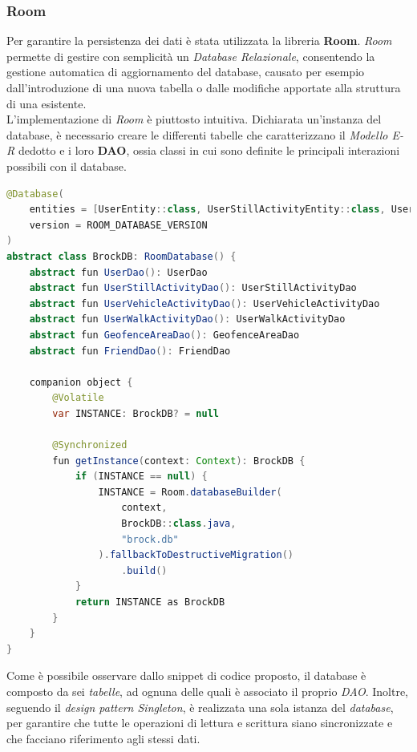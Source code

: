 \documentclass{article}
\begin{document}
    \subsubsection*{Room}
    Per garantire la persistenza dei dati è stata utilizzata la libreria \textbf{Room}. \textit{Room} permette di gestire con semplicità un \textit{Database Relazionale}, consentendo la gestione automatica di aggiornamento del database, causato per esempio dall'introduzione di una nuova tabella o dalle modifiche apportate alla struttura di una esistente. \vspace*{7pt}\\
    L'implementazione di \textit{Room} è piuttosto intuitiva. Dichiarata un'instanza del database, è necessario creare le differenti tabelle che caratterizzano il \textit{Modello E-R} dedotto e i loro \textbf{DAO}, ossia classi in cui sono definite le principali interazioni possibili con il database.
    \begin{lstlisting}[language = JAVA]
@Database(
    entities = [UserEntity::class, UserStillActivityEntity::class, UserVehicleActivityEntity::class, UserWalkActivityEntity::class, GeofenceAreaEntry::class, FriendEntity::class],
    version = ROOM_DATABASE_VERSION
)
abstract class BrockDB: RoomDatabase() {
    abstract fun UserDao(): UserDao
    abstract fun UserStillActivityDao(): UserStillActivityDao
    abstract fun UserVehicleActivityDao(): UserVehicleActivityDao
    abstract fun UserWalkActivityDao(): UserWalkActivityDao
    abstract fun GeofenceAreaDao(): GeofenceAreaDao
    abstract fun FriendDao(): FriendDao

    companion object {
        @Volatile
        var INSTANCE: BrockDB? = null

        @Synchronized
        fun getInstance(context: Context): BrockDB {
            if (INSTANCE == null) {
                INSTANCE = Room.databaseBuilder(
                    context,
                    BrockDB::class.java,
                    "brock.db"
                ).fallbackToDestructiveMigration()
                    .build()
            }
            return INSTANCE as BrockDB
        }
    }
}
    \end{lstlisting}
    Come è possibile osservare dallo snippet di codice proposto, il database è composto da sei \textit{tabelle}, ad ognuna delle quali è associato il proprio \textit{DAO}.
    Inoltre, seguendo il \textit{design pattern Singleton}, è realizzata una sola istanza del \textit{database}, per garantire che tutte le operazioni di lettura e scrittura siano sincronizzate e che facciano riferimento agli stessi dati.
\end{document}
